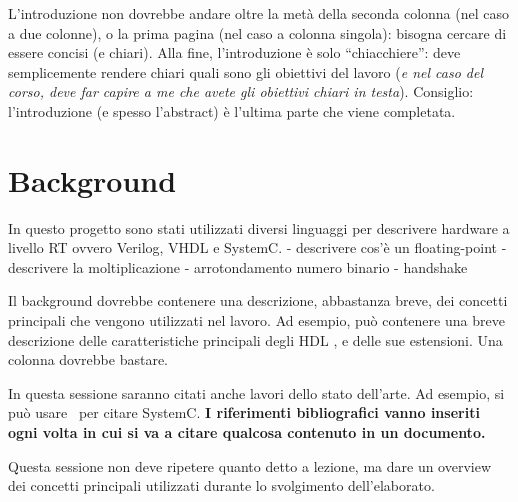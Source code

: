 \documentclass[]{IEEEtran}
\begin{document}
L'introduzione non dovrebbe andare oltre la metà della seconda colonna (nel caso a due colonne), o la prima pagina (nel caso a colonna singola): bisogna cercare di essere concisi (e chiari). Alla fine, l'introduzione è solo ``chiacchiere'': deve semplicemente rendere chiari quali sono gli obiettivi del lavoro (\emph{e nel caso del corso, deve far capire a me che avete gli obiettivi chiari in testa}). Consiglio: l'introduzione (e spesso l'abstract) è l'ultima parte che viene completata.

\section{Background}
In questo progetto sono stati utilizzati diversi linguaggi per descrivere hardware a livello RT ovvero Verilog, VHDL e SystemC. 
- descrivere cos'è un floating-point
- descrivere la moltiplicazione
- arrotondamento numero binario
- handshake

Il background dovrebbe contenere una descrizione, abbastanza breve, dei concetti principali che vengono utilizzati nel lavoro. Ad esempio, può contenere una breve descrizione delle caratteristiche principali degli HDL , e delle sue estensioni. Una colonna dovrebbe bastare.

In questa sessione saranno citati anche lavori dello stato dell'arte. Ad esempio, si può usare~\cite{SystemC} per citare SystemC. \textbf{I riferimenti bibliografici vanno inseriti ogni volta in cui si va a citare qualcosa contenuto in un documento.}

Questa sessione non deve ripetere quanto detto a lezione, ma dare un overview dei concetti principali utilizzati durante lo svolgimento dell'elaborato.
\end{document}
